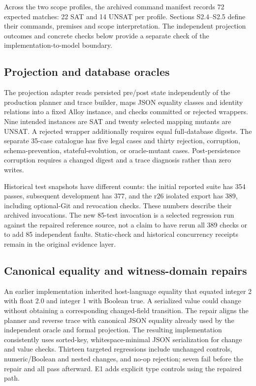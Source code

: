 \documentclass[11pt,a4paper]{article}
\begin{document}
Across the two scope profiles, the archived command manifest records 72 expected matches: 22 SAT and 14 UNSAT per profile. Sections S2.4--S2.5 define their commands, premises and scope interpretation. The independent projection outcomes and concrete checks below provide a separate check of the implementation-to-model boundary.

\subsection{Projection and database oracles}

The projection adapter reads persisted pre/post state independently of the production planner and trace builder, maps JSON equality classes and identity relations into a fixed Alloy instance, and checks committed or rejected wrappers. Nine intended instances are SAT and twenty selected mapping mutants are UNSAT. A rejected wrapper additionally requires equal full-database digests. The separate 35-case catalogue has five legal cases and thirty rejection, corruption, schema-prevention, stateful-evolution, or oracle-mutant cases. Post-persistence corruption requires a changed digest and a trace diagnosis rather than zero writes.

Historical test snapshots have different counts: the initial reported suite has 354 passes, subsequent development has 377, and the r26 isolated export has 389, including optional-Git and revocation checks. These numbers describe their archived invocations. The new 85-test invocation is a selected regression run against the repaired reference source, not a claim to have rerun all 389 checks or to add 85 independent faults. Static-check and historical concurrency receipts remain in the original evidence layer.

\subsection{Canonical equality and witness-domain repairs}

An earlier implementation inherited host-language equality that equated integer 2 with float 2.0 and integer 1 with Boolean true. A serialized value could change without obtaining a corresponding changed-field transition. The repair aligns the planner and reverse trace with canonical JSON equality already used by the independent oracle and formal projection. The resulting implementation consistently uses sorted-key, whitespace-minimal JSON serialization for change and value checks. Thirteen targeted regressions include unchanged controls, numeric/Boolean and nested changes, and no-op rejection; seven fail before the repair and all pass afterward. E1 adds explicit type controls using the repaired path.
\end{document}
